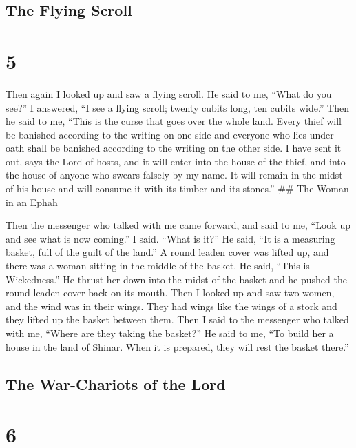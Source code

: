 \hypertarget{the-flying-scroll}{%
\subsection{The Flying Scroll}\label{the-flying-scroll}}

\hypertarget{section-4}{%
\section{5}\label{section-4}}

 Then again I looked up and saw a flying scroll.
 He said to me, ``What do you see?'' I answered, ``I see a
flying scroll; twenty cubits long, ten cubits wide.''  Then
he said to me, ``This is the curse that goes over the whole land. Every
thief will be banished according to the writing on one side and everyone
who lies under oath shall be banished according to the writing on the
other side.  I have sent it out, says the Lord of hosts, and
it will enter into the house of the thief, and into the house of anyone
who swears falsely by my name. It will remain in the midst of his house
and will consume it with its timber and its stones.'' \#\# The Woman in
an Ephah

 Then the messenger who talked with me came forward, and
said to me, ``Look up and see what is now coming.''  I said.
``What is it?'' He said, ``It is a measuring basket, full of the guilt
of the land.''  A round leaden cover was lifted up, and
there was a woman sitting in the middle of the basket.  He
said, ``This is Wickedness.'' He thrust her down into the midst of the
basket and he pushed the round leaden cover back on its mouth.
 Then I looked up and saw two women, and the wind was in
their wings. They had wings like the wings of a stork and they lifted up
the basket between them.  Then I said to the messenger who
talked with me, ``Where are they taking the basket?''  He
said to me, ``To build her a house in the land of Shinar. When it is
prepared, they will rest the basket there.''

\hypertarget{the-war-chariots-of-the-lord}{%
\subsection{The War-Chariots of the
Lord}\label{the-war-chariots-of-the-lord}}

\hypertarget{section-5}{%
\section{6}\label{section-5}}

